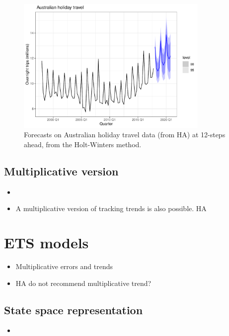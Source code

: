 \documentclass{article}
\begin{document}
\begin{itemize}
\begin{figure}[htb]
\centering
\includegraphics[width=0.825\textwidth]{fig/holiday-1.pdf}
\caption{Forecasts on Australian holiday travel data (from HA) at 12-steps
  ahead, from the Holt-Winters method.} 
\label{fig:holiday}
\end{figure}
\end{itemize}

\subsection{Multiplicative version}

\begin{itemize}
\item 
\item A multiplicative version of tracking trends is also possible. HA  
\end{itemize}

\section{ETS models}

\begin{itemize}
\item Multiplicative errors and trends
\item HA do not recommend multiplicative trend?
\end{itemize}

\subsection{State space representation}

\begin{itemize}
\item 
\end{itemize}
\end{document}
